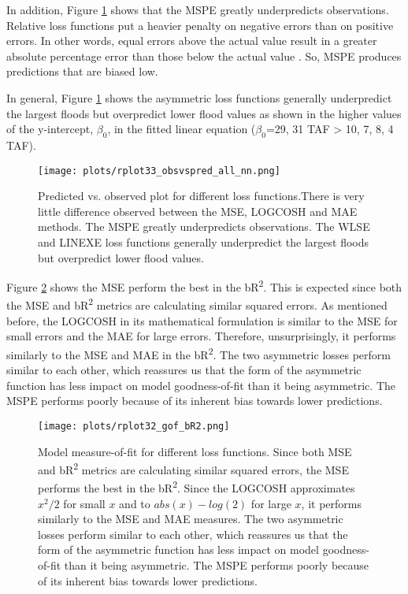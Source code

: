 In addition, Figure \ref{fig:obsvspred} shows that the MSPE greatly underpredicts observations. Relative loss functions put a heavier penalty on negative errors than on positive errors. In other words, equal errors above the actual value result in a greater absolute percentage error than those below the actual value \cite{makridakis1993accuracy}. So, MSPE produces predictions that are biased low.

In general, Figure \ref{fig:obsvspred} shows the asymmetric loss functions generally underpredict the largest floods but overpredict lower flood values as shown in the higher values of the y-intercept, $\beta_0$, in the fitted linear equation ($\beta_0$=29, 31 TAF > 10, 7, 8, 4 TAF). 

\begin{figure}
	\centering
	\texttt{[image: plots/rplot33\_obsvspred\_all\_nn.png]}
	\caption[Predicted vs. observed plot for different loss functions.]{Predicted vs. observed plot for different loss functions.There is very little difference observed between the MSE, LOGCOSH and MAE methods. The MSPE greatly underpredicts observations. The WLSE and LINEXE loss functions generally underpredict the largest floods but overpredict lower flood values.}
	\label{fig:obsvspred}
\end{figure}

Figure \ref{fig:gofbr2} shows the MSE perform the best in the bR\textsuperscript{2}. This is expected since both the MSE and bR\textsuperscript{2} metrics are calculating similar squared errors. As mentioned before, the LOGCOSH in its mathematical formulation is similar to the MSE for small errors and the MAE for large errors. Therefore, unsurprisingly, it performs similarly to the MSE and MAE in the bR\textsuperscript{2}. The two asymmetric losses perform similar to each other, which reassures us that the form of the asymmetric function has less impact on model goodness-of-fit than it being asymmetric. The MSPE performs poorly because of its inherent bias towards lower predictions.
 
\begin{figure}
	\centering
	\texttt{[image: plots/rplot32\_gof\_bR2.png]}
	\caption[Model measure-of-fit for different loss functions.]{Model measure-of-fit for different loss functions. Since both MSE and bR\textsuperscript{2} metrics are calculating similar squared errors, the MSE performs the best in the bR\textsuperscript{2}. Since the LOGCOSH approximates $x^ 2/2$ for small $x$ and to $abs(x) - log(2)$ for large $x$, it performs similarly to the MSE and MAE measures. The two asymmetric losses perform similar to each other, which reassures us that the form of the asymmetric function has less impact on model goodness-of-fit than it being asymmetric. The MSPE performs poorly because of its inherent bias towards lower predictions.}
	\label{fig:gofbr2}
\end{figure}

